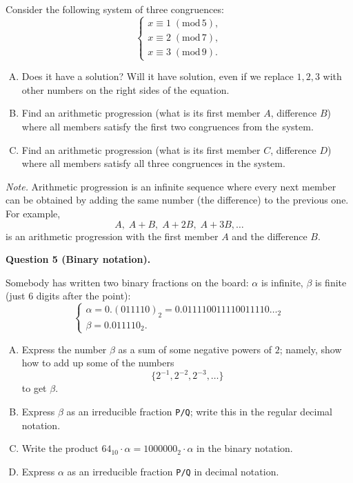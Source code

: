 \documentclass[jou]{apa6}
\begin{document}
Consider the following system of three congruences:
$$\left\{ \begin{array}{l}
x \equiv 1\;(\text{mod}\,5),\\
x \equiv 2\;(\text{mod}\,7),\\
x \equiv 3\;(\text{mod}\,9).
\end{array} \right.$$

\begin{enumerate}[(A)]
\item Does it have a solution? Will it have solution, even if we replace $1,2,3$ with other numbers
on the right sides of the equation.
\item Find an arithmetic progression (what is its first member $A$, difference $B$) where all members satisfy
the first two congruences from the system.
\item Find an arithmetic progression (what is its first member $C$, difference $D$) where all members satisfy
all three congruences in the system.
\end{enumerate}

{\em Note.} Arithmetic progression is an infinite sequence where every next member can be obtained
by adding the same number (the difference) to the previous one. For example, 
$$A,\;A+B,\;A+2B,\;A+3B,\ldots$$
is an arithmetic progression with the first member $A$ and the difference $B$.


\vspace{10pt}
{\bf Question 5 (Binary notation).}

Somebody has written two binary fractions on the board: $\alpha$ is infinite, $\beta$ is finite (just $6$ digits
after the point): 
$$\left\{ \begin{array}{l}
\alpha = 0.(011110)_2 = 0.011110011110011110\ldots_2\\
\beta = 0.011110_2.
\end{array} \right.$$

\begin{enumerate}[(A)]
\item Express the number $\beta$ as a sum of some negative powers of $2$; 
namely, show how to add up some of the numbers
$$\{ 2^{-1}, 2^{-2}, 2^{-3}, \ldots \}$$ 
to get $\beta$. 
\item Express $\beta$ as an irreducible fraction {\tt P/Q}; write this in the regular decimal notation. 
\item Write the product $64_{10} \cdot \alpha = 1000000_2 \cdot \alpha$ in the binary notation. 
\item Express $\alpha$ as an irreducible fraction {\tt P/Q} in decimal notation.
\end{enumerate}
\end{document}
